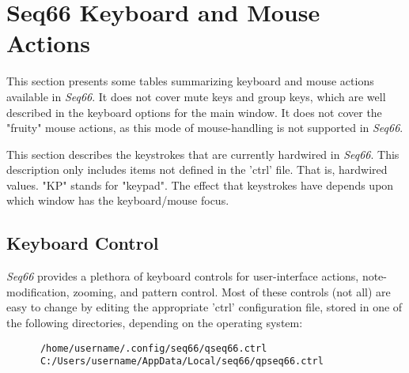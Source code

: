 %
%
%

\section{Seq66 Keyboard and Mouse Actions}
\label{sec:kbd_mouse_actions}

   This section presents some tables summarizing keyboard and mouse actions
   available in \textsl{Seq66}.
   It does not cover mute keys and group keys, which are well
   described in the keyboard options for the main window.
   It does not cover the "fruity" mouse actions, as this mode of mouse-handling
   is not supported in \textsl{Seq66}.


   This section describes the keystrokes that are currently hardwired
   in \textsl{Seq66}.
   This description only includes items not defined in the 'ctrl' file.
   That is, hardwired values.
   "KP" stands for "keypad".
   The effect that keystrokes have depends upon
   which window has the keyboard/mouse focus.

\subsection{Keyboard Control}
\label{subsec:kbd_mouse_keyboard_control}

   \textsl{Seq66} provides a plethora of keyboard controls for user-interface
   actions, note-modification, zooming, and pattern control.
   Most of these controls (not all)
   are easy to change by editing the appropriate 'ctrl'
   configuration file, stored in one of the following directories, depending on
   the operating system:
   
   \begin{verbatim}
      /home/username/.config/seq66/qseq66.ctrl
      C:/Users/username/AppData/Local/seq66/qpseq66.ctrl
   \end{verbatim}

